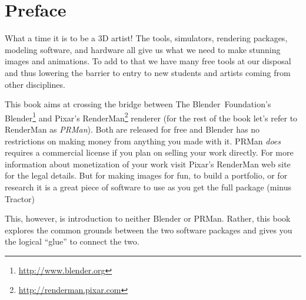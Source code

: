 \chapter*{Preface}
What a time it is to be a 3D artist!  The tools, simulators, rendering packages, modeling software, and hardware all give us what we need to make stunning images and animations.  To add to that we have many free tools at our disposal and thus lowering the barrier to entry to new students and artists coming from other disciplines.

This book aims at crossing the bridge between The \mbox{Blender Foundation's} Blender\footnote{\url{http://www.blender.org}} and Pixar's RenderMan\footnote{\url{http://renderman.pixar.com}} renderer (for the rest of the book let's refer to RenderMan as \emph{PRMan}).  Both are released for free and  Blender has no restrictions on making money from anything you made with it.   PRMan \emph{does} requires a commercial license if you plan on selling your work directly.  For more information about monetization of your work visit Pixar's RenderMan web site for the legal details.  But for making images for fun, to build a portfolio, or for research it is a great piece of software to use as you get the full package (minus Tractor)

This, however, is introduction to neither Blender or PRMan.  Rather, this book explores the common grounds between the two software packages and gives you the logical ``glue'' to connect the two.


